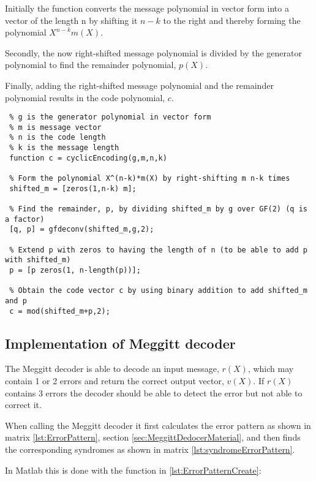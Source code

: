 \documentclass[Main]{subfiles}
\begin{document}
Initially the function converts the message polynomial in vector form into a vector of the length n by shifting it $n-k$ to the right and thereby forming the polynomial $X^{n-k}m(X)$. 

Secondly, the now right-shifted message polynomial is divided by the generator polynomial to find the remainder polynomial, $p(X)$.

Finally, adding the right-shifted message polynomial and the remainder polynomial results in the code polynomial, $c$.  

\begin{lstlisting}[caption=Cyclic Encoder, style=Code-Matlab, label=lst:refID]
 % cyclicEncoding is a function that encodes a message vector into systematic code given the following parameters
 % g is the generator polynomial in vector form
 % m is message vector
 % n is the code length
 % k is the message length
 function c = cyclicEncoding(g,m,n,k)

 % Form the polynomial X^(n-k)*m(X) by right-shifting m n-k times 
 shifted_m = [zeros(1,n-k) m];

 % Find the remainder, p, by dividing shifted_m by g over GF(2) (q is a factor)
 [q, p] = gfdeconv(shifted_m,g,2);

 % Extend p with zeros to having the length of n (to be able to add p with shifted_m)
 p = [p zeros(1, n-length(p))];

 % Obtain the code vector c by using binary addition to add shifted_m and p 
 c = mod(shifted_m+p,2);
\end{lstlisting}







\subsection{Implementation of Meggitt decoder}
\label{sec:ImplementMeggittDecoder}
The Meggitt decoder is able to decode an input message, $r(X)$, which may contain 1 or 2 errors and return the correct output vector, $v(X)$.
If $r(X)$ contains 3 errors the decoder should be able to detect the error but not able to correct it.

When calling the Meggitt decoder it first calculates the error pattern as shown in matrix \ref{lst:ErrorPattern}, section \ref{sec:MeggittDedocerMaterial}, and then finds the corresponding syndromes as shown in matrix \ref{lst:syndromeErrorPattern}.

In Matlab this is done with the function in \codeTitle \ref{lst:ErrorPatternCreate}:
\end{document}
